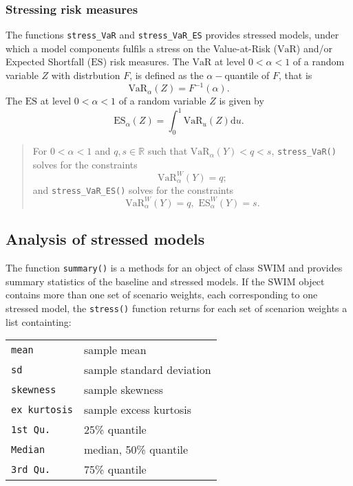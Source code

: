 \documentclass[]{article}
\begin{document}
\hypertarget{stressing-risk-measures}{%
\subsubsection{Stressing risk measures}\label{stressing-risk-measures}}

The functions \texttt{stress\_VaR} and \texttt{stress\_VaR\_ES} provides stressed models, under which a model components fulfils a stress on the Value-at-Risk (\(\text{VaR}\)) and/or Expected Shortfall (\(\text{ES}\)) risk measures. The \(\text{VaR}\) at level \(0 < \alpha < 1\) of a random variable \(Z\) with distrbution \(F\), is defined as the \(\alpha-\)quantile of \(F\), that is \[\text{VaR}_\alpha(Z) = F^{-1}(\alpha).\] The \(\text{ES}\) at level \(0 < \alpha < 1\) of a random variable \(Z\) is given by \[\text{ES}_\alpha(Z) = \int_0^1 \text{VaR}_u(Z) \mathrm{d}u.\]

\begin{quote}
For \(0< \alpha <1\) and \(q, s \in \mathbb{R}\) such that \(\text{VaR}_{\alpha}(Y)<q < s\), \texttt{stress\_VaR()} solves for the constraints
\begin{equation} 
\text{VaR}_{\alpha }^W(Y) = q;  \label{eq:optimisationVaR}
\end{equation}
and \texttt{stress\_VaR\_ES()} solves for the constraints
\begin{equation}                                                
\text{VaR}_{\alpha }^W(Y) = q, \text{ ES}_{\alpha }^W(Y) = s.\label{eq:optimisationVaRES}
\end{equation}
\end{quote}

\hypertarget{Sec:analysis}{%
\subsection{Analysis of stressed models}\label{Sec:analysis}}

The function \texttt{summary()} is a methods for an object of class SWIM and provides summary statistics of the baseline and stressed models. If the SWIM object contains more than one set of scenario weights, each corresponding to one stressed model, the \texttt{stress()} function returns for each set of scenarion weights a list containting:

\begin{longtable}[]{@{}ll@{}}
\toprule
\endhead
\texttt{mean} & sample mean\tabularnewline
\texttt{sd} & sample standard deviation\tabularnewline
\texttt{skewness} & sample skewness\tabularnewline
\texttt{ex\ kurtosis} & sample excess kurtosis\tabularnewline
\texttt{1st\ Qu.} & 25\% quantile\tabularnewline
\texttt{Median} & median, 50\% quantile\tabularnewline
\texttt{3rd\ Qu.} & 75\% quantile\tabularnewline
\bottomrule
\end{longtable}
\end{document}
